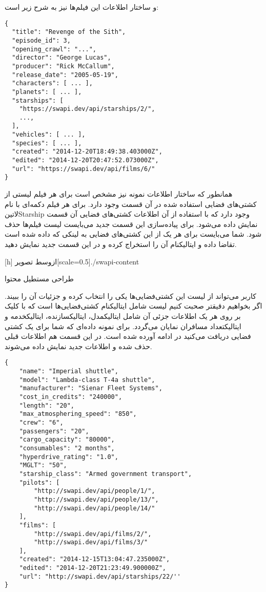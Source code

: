 \documentclass[../main.tex]{subfiles}
\begin{document}
و ساختار اطلاعات این فیلم‌ها نیز به شرح زیر است:

\begin{latin}
\begin{verbatim}
{
  "title": "Revenge of the Sith",
  "episode_id": 3,
  "opening_crawl": "...",
  "director": "George Lucas",
  "producer": "Rick McCallum",
  "release_date": "2005-05-19",
  "characters": [ ... ],
  "planets": [ ... ],
  "starships": [
    "https://swapi.dev/api/starships/2/",
    ...,
  ],
  "vehicles": [ ... ],
  "species": [ ... ],
  "created": "2014-12-20T18:49:38.403000Z",
  "edited": "2014-12-20T20:47:52.073000Z",
  "url": "https://swapi.dev/api/films/6/"
}
\end{verbatim}
\end{latin}

همانطور که ساختار اطلاعات نمونه نیز مشخص است برای هر فیلم لیستی از کشتی‌های فضایی استفاده شده در آن قسمت وجود دارد.
برای هر فیلم دکمه‌ای با نام ‌لاتین{Starship} وجود دارد که با استفاده از آن اطلاعات کشتی‌های فضایی آن قسمت نمایش داده می‌شود.
برای پیاده‌سازی این قسمت جدید می‌بایست لیست فیلم‌ها حذف شود.
شما می‌بایست برای هر یک از این کشتی‌های فضایی به لینکی که داده شده است تقاضا داده و ‌ایتالیک{نام} آن را استخراج کرده
و در این قسمت جدید نمایش دهید.

[h]
  ‌ازوسط
  ‌تصویر[scale=0.5]{./swapi-content}
  \caption{طراحی مستطیل محتوا}

کاربر می‌تواند از لیست این کشتی‌فضایی‌ها یکی را انتخاب کرده و جزئیات آن را ببیند.
اگر بخواهیم دقیقتر صحبت کنیم لیست شامل ‌ایتالیک{نام} کشتی‌فضایی‌ها است
که با کلیک بر روی هر یک اطلاعات جزئی آن شامل ‌ایتالیک{مدل}، ‌ایتالیک{سازنده}، ‌ایتالیک{خدمه} و ‌ایتالیک{تعداد مسافران} نمایان می‌گردد.
برای نمونه داده‌ای که شما برای یک کشتی فضایی دریافت می‌کنید در ادامه آورده شده است.
در این قسمت هم اطلاعات قبلی حذف شده و اطلاعات جدید نمایش داده می‌شوند.

\begin{latin}
\begin{verbatim}
{
    "name": "Imperial shuttle",
    "model": "Lambda-class T-4a shuttle",
    "manufacturer": "Sienar Fleet Systems",
    "cost_in_credits": "240000",
    "length": "20",
    "max_atmosphering_speed": "850",
    "crew": "6",
    "passengers": "20",
    "cargo_capacity": "80000",
    "consumables": "2 months",
    "hyperdrive_rating": "1.0",
    "MGLT": "50",
    "starship_class": "Armed government transport",
    "pilots": [
        "http://swapi.dev/api/people/1/",
        "http://swapi.dev/api/people/13/",
        "http://swapi.dev/api/people/14/"
    ],
    "films": [
        "http://swapi.dev/api/films/2/",
        "http://swapi.dev/api/films/3/"
    ],
    "created": "2014-12-15T13:04:47.235000Z",
    "edited": "2014-12-20T21:23:49.900000Z",
    "url": "http://swapi.dev/api/starships/22/''
}
\end{verbatim}
\end{latin}
\end{document}
